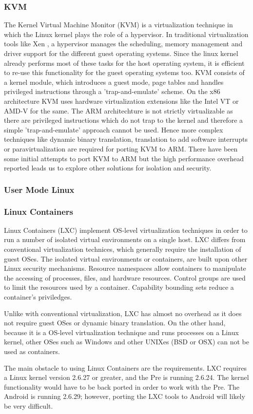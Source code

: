 \subsubsection{KVM}
The Kernel Virtual Machine Monitor (KVM) is a virtualization technique in which the Linux kernel plays the role of a hypervisor. In traditional virtualization tools like Xen \cite{xen}, a hypervisor manages the scheduling, memory management and driver support for the different guest operating systems. Since the linux kernel already performs most of these tasks for the host operating system, it is efficient to re-use this functionality for the guest operating systems too. KVM consists of a kernel module, which introduces a guest mode,  page tables and handles privileged instructions through a 'trap-and-emulate' scheme. On the x86 architecture KVM uses hardware virtualization extensions like the Intel VT or AMD-V for the same. 
The ARM architechture is not strictly virtualizable as there are privileged instructions which do not trap to the kernel and therefore a simple 'trap-and-emulate' approach cannot be used. Hence more complex techniques like dynamic binary translation, translation to add software interrupts or paravirtualization are required for porting KVM to ARM. There have been some initial attempts to port KVM to ARM \cite{columbia} but the high performance overhead reported leads us to explore other solutions for isolation and security. 

\subsubsection{User Mode Linux}

\subsubsection{Linux Containers}
Linux Containers (LXC) implement OS-level virtualization techniques in order to run a number of isolated virtual environments on a single host.  LXC differs from conventional virtualization technices, which generally require the installation of guest OSes.  The isolated virtual environments or containers, are built upon other Linux security mechanisms.  Resource namespaces allow containers to manipulate the accessing of processes, files, and hardware resources.  Control groups are used to limit the resources used by a container.  Capability bounding sets reduce a container's priviledges.  

Unlike with conventional virtualization, LXC has almost no overhead as it does not require guest OSes or dynamic binary translation.  On the other hand, because it is a OS-level virtualization technique and runs processes on a Linux kernel, other OSes such as Windows and other UNIXes (BSD or OSX) can not be used as containers.  

The main obstacle to using Linux Containers are the requirements.  LXC requires a Linux kernel version 2.6.27 or greater, and the Pre is running 2.6.24.  The kernel functionality would have to be back ported in order to work with the Pre.  The Android is running 2.6.29; however, porting the LXC tools to Android will likely be very difficult.
